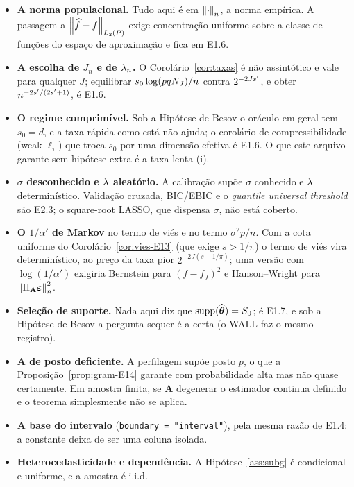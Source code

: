 \documentclass[11pt,a4paper]{article}
\newcommand{\Amat}{\mathbf{A}}
\newcommand{\PA}{\Pi_{\Amat}}
\newcommand{\bveps}{\boldsymbol{\varepsilon}}
\begin{document}
\begin{itemize}[nosep, leftmargin=*]
  \item \textbf{A norma populacional.} Tudo aqui é em $\left\lVert \cdot \right\rVert_{n}$, a norma
    empírica. A passagem a $\left\lVert \widehat{f}-f \right\rVert_{L_{2}(P)}$ exige concentração
    uniforme sobre a classe de funções do espaço de aproximação e fica em E1.6.
  \item \textbf{A escolha de $J_{n}$ e de $\lambda_{n}$.} O Corolário~\ref{cor:taxas}
    é não assintótico e vale para qualquer $J$; equilibrar
    $s_{0}\log(pqN_{J})/n$ contra $2^{-2Js'}$, e obter
    $n^{-2s'/(2s'+1)}$, é E1.6.
  \item \textbf{O regime comprimível.} Sob a Hipótese de Besov o oráculo em
    geral tem $s_{0} = d$, e a taxa rápida como está não ajuda; o corolário de
    compressibilidade (weak-$\ell_{\tau}$) que troca $s_{0}$ por uma dimensão
    efetiva é E1.6. O que este arquivo garante sem hipótese extra é a taxa
    lenta (i).
  \item \textbf{$\sigma$ desconhecido e $\lambda$ aleatório.} A calibração supõe
    $\sigma$ conhecido e $\lambda$ determinístico. Validação cruzada, BIC/EBIC e
    o \emph{quantile universal threshold} são E2.3; o square-root LASSO, que
    dispensa $\sigma$, não está coberto.
  \item \textbf{O $1/\alpha'$ de Markov} no termo de viés e no termo
    $\sigma^{2}p/n$. Com a cota uniforme do Corolário~\ref{cor:vies-E13}
    (que exige $s > 1/\pi$) o termo de viés vira determinístico, ao preço da
    taxa pior $2^{-2J(s-1/\pi)}$; uma versão com $\log(1/\alpha')$ exigiria
    Bernstein para $(f-f_{J})^{2}$ e Hanson--Wright para $\normn{\PA\bveps}^{2}$.
  \item \textbf{Seleção de suporte.} Nada aqui diz que
    $\operatorname{supp}(\widehat{\boldsymbol{\theta}}) = S_{0}$; é E1.7, e sob a Hipótese de
    Besov a pergunta sequer é a certa (o WALL faz o mesmo registro).
  \item \textbf{$\Amat$ de posto deficiente.} A perfilagem supõe posto $p$, o
    que a Proposição~\ref{prop:gram-E14} garante com probabilidade alta mas não
    quase certamente. Em amostra finita, se $\Amat$ degenerar o estimador
    continua definido e o teorema simplesmente não se aplica.
  \item \textbf{A base do intervalo} (\texttt{boundary = "interval"}), pela
    mesma razão de E1.4: a constante deixa de ser uma coluna isolada.
  \item \textbf{Heterocedasticidade e dependência.} A Hipótese~\ref{ass:subg} é
    condicional e uniforme, e a amostra é i.i.d.
\end{itemize}
\end{document}
